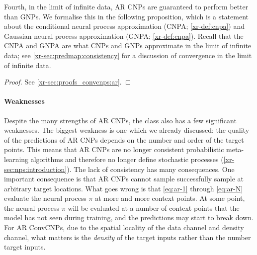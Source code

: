 \documentclass[12pt]{report}
\newcommand{\xrprefix}[1]{xr-#1}
\begin{document}
Fourth, in the limit of infinite data, AR CNPs are guaranteed to perform better than GNPs.
We formalise this in the following proposition, which is a statement about the conditional neural process approximation (CNPA; \cref{\xrprefix{def:cnpa}})
and Gaussian neural process approximation (GNPA; \cref{\xrprefix{def:cnpa}}).
Recall that the CNPA and GNPA are what CNPs and GNPs approximate in the limit of infinite data;
see \cref{\xrprefix{sec:predmap:consistency}} for a discussion of convergence in the limit of infinite data.

\begin{proof}
    See \cref{\xrprefix{sec:proofs_convcnps:ar}}.
\end{proof}


\paragraph{Weaknesses} Despite the many strengths of AR CNPs, 
the class also has a few significant weaknesses.
The biggest weakness is one which we already discussed:
the quality of the predictions of AR CNPs depends on the number and order of the target points.
This means that AR CNPs are no longer consistent probabilistic meta-learning algorithms and therefore no longer define stochastic processes (\cref{\xrprefix{sec:nps:introduction}}).
The lack of consistency has many consequences.
One important consequence is that AR CNPs cannot sample successfully sample at arbitrary target locations.
What goes wrong is that \eqref{eq:ar-1} through \eqref{eq:ar-N} evaluate the neural process $\pi$ at more and more context points.
At some point, the neural process $\pi$ will be evaluated at a number of context points that the model has not seen during training, and the predictions may start to break down.
For AR ConvCNPs, due to the spatial locality of the data channel and density channel, what matters is the \emph{density} of the target inputs rather than the number target inputs.
\end{document}
